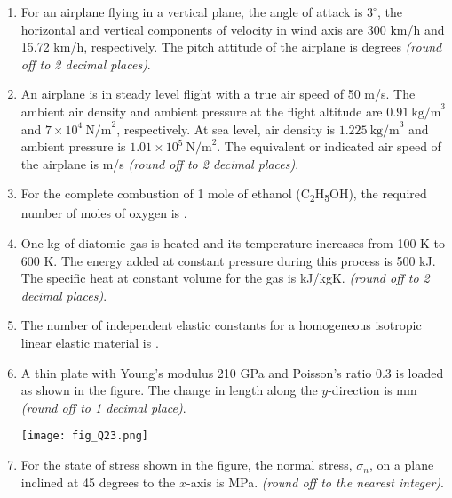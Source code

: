 \documentclass[12pt]{article}
\begin{document}
\begin{enumerate}[label=Q.\arabic*]
	\item For an airplane flying in a vertical plane, the angle of attack is $3^\circ$, the horizontal and vertical components of velocity in wind axis are 300 km/h and 15.72 km/h, respectively. The pitch attitude of the airplane is \underline{\hspace{1.5cm}} degrees \textit{(round off to 2 decimal places)}.

	\item An airplane is in steady level flight with a true air speed of 50 m/s. The ambient air density and ambient pressure at the flight altitude are $0.91 \ \text{kg/m}^3$ and $7 \times 10^4 \ \text{N/m}^2$, respectively. At sea level, air density is $1.225 \ \text{kg/m}^3$ and ambient pressure is $1.01 \times 10^5 \ \text{N/m}^2$. The equivalent or indicated air speed of the airplane is \underline{\hspace{1.5cm}} m/s \textit{(round off to 2 decimal places)}.
	\item For the complete combustion of 1 mole of ethanol (C\textsubscript{2}H\textsubscript{5}OH), the required number of moles of oxygen is \underline{\hspace{1.5cm}}.

	\item One kg of diatomic gas is heated and its temperature increases from 100 K to 600 K. The energy added at constant pressure during this process is 500 kJ. The specific heat at constant volume for the gas is \underline{\hspace{2cm}} kJ/kgK. \textit{(round off to 2 decimal places)}.

	\item The number of independent elastic constants for a homogeneous isotropic linear elastic material is \underline{\hspace{1.5cm}}.

	\item A thin plate with Young’s modulus 210 GPa and Poisson’s ratio 0.3 is loaded as shown in the figure. The change in length along the $y$-direction is \underline{\hspace{2cm}} mm \textit{(round off to 1 decimal place)}.

		\begin{center}
			\texttt{[image: fig\_Q23.png]}
		\end{center}
		\newpage
	\item For the state of stress shown in the figure, the normal stress, $\sigma_n$, on a plane inclined at 45 degrees to the $x$-axis is \underline{\hspace{2cm}} MPa. \textit{(round off to the nearest integer)}.


\end{enumerate}
\end{document}
